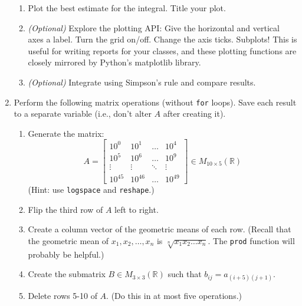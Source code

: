 \documentclass{article}
\begin{document}
\begin{enumerate}
\begin{enumerate}
			\item Plot the best estimate for the integral. Title your plot.
			
			\item \textit{(Optional)} Explore the plotting API: Give the horizontal and vertical axes a label. Turn the grid on/off. Change the axis ticks. Subplots! This is useful for writing reports for your classes, and these plotting functions are closely mirrored by Python's matplotlib library.
			
			\item \textit{(Optional)} Integrate using Simpson's rule and compare results.
		\end{enumerate}
		
		\clearpage
		\item Perform the following matrix operations (without \lstinline|for| loops). Save each result to a separate variable (i.e., don't alter $A$ after creating it).
		\begin{enumerate}
			\item Generate the matrix:
			\begin{equation*}
				A=\begin{bmatrix}
				10^{0} & 10^{1} & \dots & 10^{4} \\
				10^{5} & 10^6 & \dots & 10^9 \\
				\vdots & \vdots & \ddots & \vdots \\
				10^{45} & 10^{46} & \dots & 10^{49}
				\end{bmatrix}\in M_{10\times 5}(\mathbb{R})
			\end{equation*}
			(Hint: use \lstinline|logspace| and \lstinline|reshape|.)
			
			\item Flip the third row of $A$ left to right.
			
			\item Create a column vector of the geometric means of each row. (Recall that the geometric mean of $x_1,x_2,\dots,x_n$ is $\sqrt[n]{x_1x_2\dots x_n}$. The \lstinline|prod| function will probably be helpful.)
			
			\item Create the submatrix $B\in M_{3\times 3}(\mathbb{R})$ such that $b_{ij}=a_{(i+5)(j+1)}$.
			
			\item Delete rows 5-10 of $A$. (Do this in at most five operations.)
		\end{enumerate}
		

\end{enumerate}
\end{document}
